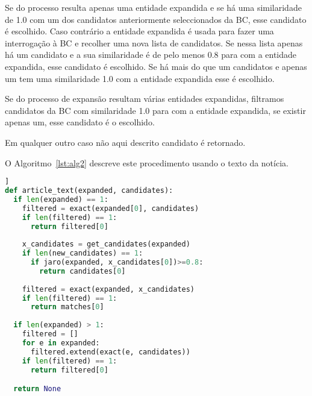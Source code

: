 \documentclass[a4paper, twocolumn, 11pt, twoside]{article}
\begin{document}
Se do processo resulta apenas uma entidade expandida e se há uma similaridade de 1.0 com um dos candidatos anteriormente seleccionados da BC, esse candidato é escolhido. Caso contrário a entidade expandida é usada para fazer uma interrogação à BC e recolher uma nova lista de candidatos. Se nessa lista apenas há um candidato e a sua similaridade é de pelo menos 0.8 para com a entidade expandida, esse candidato é escolhido. Se há mais do que um candidatos e apenas um tem uma similaridade 1.0 com a entidade expandida esse é escolhido. 

Se do processo de expansão resultam várias entidades expandidas, filtramos candidatos da BC com similaridade 1.0 para com a entidade expandida, se existir apenas um, esse candidato é o escolhido. 

Em qualquer outro caso não aqui descrito candidato é retornado.

O Algoritmo~\ref{lst:alg2} descreve este procedimento usando o texto da notícia.

\begin{lstlisting}[language=python,columns=fullflexible,frame=single,label={lst:alg2},title={Algoritmo 6.2. Ligação com a Wikidata usando o texto da notícia para expandir as entidades reconhecidas no título.},captionpos=b]]
def article_text(expanded, candidates):
  if len(expanded) == 1:
    filtered = exact(expanded[0], candidates)
	if len(filtered) == 1:
	  return filtered[0]
	  
    x_candidates = get_candidates(expanded)
    if len(new_candidates) == 1:
      if jaro(expanded, x_candidates[0])>=0.8:
        return candidates[0]
 
    filtered = exact(expanded, x_candidates)
    if len(filtered) == 1:
      return matches[0]
  
  if len(expanded) > 1:
    filtered = []
    for e in expanded:
      filtered.extend(exact(e, candidates))
    if len(filtered) == 1:
      return filtered[0]

  return None
\end{lstlisting}


\begin{comment}

\begin{lstlisting}[language=python,columns=fullflexible,label={lst:alg3},caption=News text approach.]]

def entity_linking(per):
    candidates = get_candidates(ent)
    wiki_id = title_only(per, candidates)
    if not wiki_id:
        expanded = expand(per, news_text)
        wiki_id = article_text(candidates, expanded)
    return wiki_id
\end{lstlisting}

\end{comment}
\end{document}
